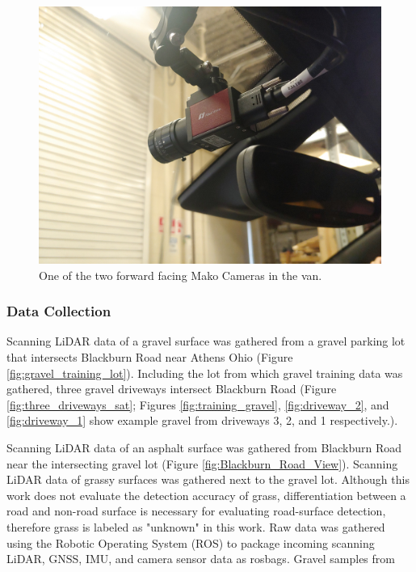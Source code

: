 \documentclass[numbered,pdftex]{ohio-etd}
\begin{document}
{{{{				\begin{figure}[H]
					\centering
					\includegraphics[width=0.7\linewidth]{Defense_Images/Mako_Camera}
					\caption[Mako Camera]{One of the two forward facing Mako Cameras in the van.}
					\label{fig:makocamera}
				\end{figure}
			
			} %
			
			\subsubsection{Data Collection}{
				
				{Scanning LiDAR data of a gravel surface was gathered from a gravel parking lot that intersects Blackburn Road near Athens Ohio (Figure \ref{fig:gravel_training_lot}). Including the lot from which gravel training data was gathered, three gravel driveways intersect Blackburn Road (Figure \ref{fig:three_driveways_sat}; Figures \ref{fig:training_gravel}, \ref{fig:driveway_2}, and \ref{fig:driveway_1} show example gravel from driveways 3, 2, and 1 respectively.). 
					
					Scanning LiDAR data of an asphalt surface was gathered from Blackburn Road near the intersecting gravel lot (Figure \ref{fig:Blackburn_Road_View}). Scanning LiDAR data of grassy surfaces was gathered next to the gravel lot. Although this work does not evaluate the detection accuracy of grass, differentiation between a road and non-road surface is necessary for evaluating road-surface detection, therefore grass is labeled as "unknown" in this work. Raw data was gathered using the Robotic Operating System (ROS) to package incoming scanning LiDAR, GNSS, IMU, and camera sensor data as rosbags.  Gravel samples from }
				
}}}}
\end{document}
